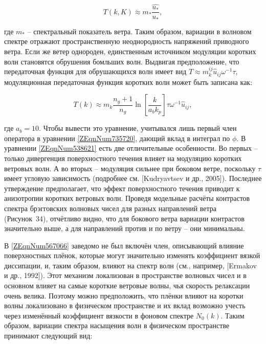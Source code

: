 \begin{equation} \label{1.41)} T\left(k,K\right)\approx m_{*} \frac{\widehat{u_{*} }}{u_{*} } ,  \end{equation} 



\noindent где $m_{*} $ -- спектральный показатель ветра. Таким образом, вариации в волновом спектре отражают пространственную неоднородность напряжений приводного ветра. Если же ветер однороден, единственным источником модуляции коротких волн становятся обрушения бомльших волн. Выдвигая предположение, что передаточная функция для обрушающихся волн имеет вид $T\approx m_{k}^{ij} \widehat{u}_{ij} \omega ^{-1} \tau $, модуляционная передаточная функция коротких волн может быть записана как:



\begin{equation} \label{1.42)} T\left(k\right)\approx m_{k} \frac{n_{g} +1}{n_{g} } \ln \left[\frac{k}{a_{b} k_{p} } \right]\tau \omega ^{-1} \widehat{u}_{ij} ,  \end{equation} 



\noindent где $a_{b} =10$. Чтобы вывести это уравнение, учитывался лишь первый член оператора в уравнении \eqref{ZEqnNum735720}, дающий вклад в интеграл по $\phi $. В уравнении \eqref{ZEqnNum538621} есть две отличительные особенности. Во первых -- только дивергенция поверхностного течения влияет на модуляцию коротких ветровых волн. А во вторых -- модуляция сильнее при боковом ветре, поскольку $\tau $ имеет угловую зависимость (подробнее см. [Kudryavtsev и др., 2005]). Последнее утверждение предполагает, что эффект поверхностного течения приводит к анизотропии коротких ветровых волн. Проведя модельные расчёты контрастов спектра брэгговских волновых чисел для разных направлений ветра (Рисунок~34), отчётливо видно, что для бокового ветра вариации контрастов значительно выше, а для направлений против и по ветру -- они минимальны. 

В \eqref{ZEqnNum567066} заведомо не был включён член, описывающий влияние поверхностных плёнок, которые могут значительно изменять коэффициент вязкой диссипации, и, таким образом, влияют на спектр волн (см., например, [Ermakov и др., 1992]). Этот механизм локализован в пространстве волновых чисел и в основном влияет на самые короткие ветровые волны, чья скорость релаксации очень велика. Поэтому можно предположить, что плёнки влияют на коротки волны локализовано в физическом пространстве и их вклад возможно учесть через изменённый коэффициент вязкости в фоновом спектре $N_{0} \left(k\right)$. Таким образом, вариации спектра насыщения волн в физическом пространстве принимают следующий вид:



